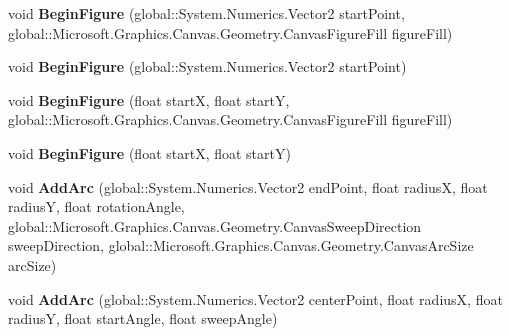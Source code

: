 \begin{DoxyCompactItemize}
void {\bfseries Begin\+Figure} (global\+::\+System.\+Numerics.\+Vector2 start\+Point, global\+::\+Microsoft.\+Graphics.\+Canvas.\+Geometry.\+Canvas\+Figure\+Fill figure\+Fill)
\item 
\mbox{\label{interface_microsoft_1_1_graphics_1_1_canvas_1_1_geometry_1_1_i_canvas_path_builder_aa01f534a0d57d542b6e74f2939e13d54}} 
void {\bfseries Begin\+Figure} (global\+::\+System.\+Numerics.\+Vector2 start\+Point)
\item 
\mbox{\label{interface_microsoft_1_1_graphics_1_1_canvas_1_1_geometry_1_1_i_canvas_path_builder_ab65fd089f5c2a5bdb2e36fe9c552044a}} 
void {\bfseries Begin\+Figure} (float startX, float startY, global\+::\+Microsoft.\+Graphics.\+Canvas.\+Geometry.\+Canvas\+Figure\+Fill figure\+Fill)
\item 
\mbox{\label{interface_microsoft_1_1_graphics_1_1_canvas_1_1_geometry_1_1_i_canvas_path_builder_acbe72d48edf4e1066adf59e9f7057323}} 
void {\bfseries Begin\+Figure} (float startX, float startY)
\item 
\mbox{\label{interface_microsoft_1_1_graphics_1_1_canvas_1_1_geometry_1_1_i_canvas_path_builder_aeb2d7c2ee7825de333cf7adbdc0901c8}} 
void {\bfseries Add\+Arc} (global\+::\+System.\+Numerics.\+Vector2 end\+Point, float radiusX, float radiusY, float rotation\+Angle, global\+::\+Microsoft.\+Graphics.\+Canvas.\+Geometry.\+Canvas\+Sweep\+Direction sweep\+Direction, global\+::\+Microsoft.\+Graphics.\+Canvas.\+Geometry.\+Canvas\+Arc\+Size arc\+Size)
\item 
\mbox{\label{interface_microsoft_1_1_graphics_1_1_canvas_1_1_geometry_1_1_i_canvas_path_builder_a176681b2cfb8be5b87fb7ff6c54d6d1c}} 
void {\bfseries Add\+Arc} (global\+::\+System.\+Numerics.\+Vector2 center\+Point, float radiusX, float radiusY, float start\+Angle, float sweep\+Angle)
\item 
\mbox{\label{interface_microsoft_1_1_graphics_1_1_canvas_1_1_geometry_1_1_i_canvas_path_builder_a0f6e31b27417edcdf586fecf8619b879}} 

\end{DoxyCompactItemize}

